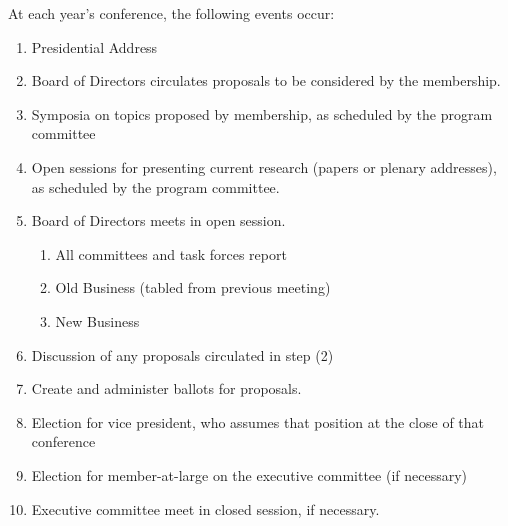 \begin{refsection}
At each year's conference, the following events occur:




\begin{enumerate}

\item Presidential Address \newline
\item  Board of Directors circulates proposals to be considered by the membership. \newline
\item Symposia on topics proposed by membership, as scheduled by the program committee \newline
\item  Open sessions for presenting current research (papers or plenary addresses), as scheduled by the program committee. \newline
\item  Board of Directors meets in open session. \newline
\begin{enumerate}
    \item  All committees and task forces report \newline
    \item  Old Business (tabled from previous meeting) \newline
    \item  New Business \newline
\end{enumerate}
\item  Discussion of any proposals circulated in step (2) \newline
\item  Create and administer ballots for proposals. \newline
\item  Election for vice president, who assumes that position at the close of that conference \newline
\item  Election for member-at-large on the executive committee (if necessary) \newline
\item  Executive committee meet in closed session, if necessary. \newline
\end{enumerate}




\end{refsection}

